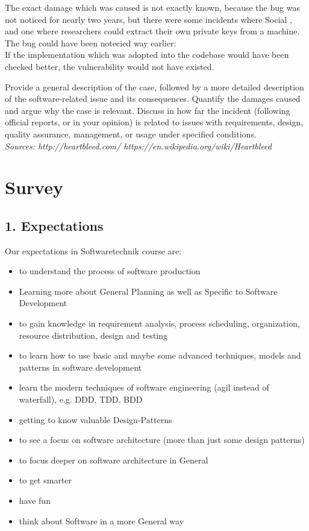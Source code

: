 \documentclass{scrartcl}
\begin{document}
The exact damage which was caused is not exactly known, because the bug was not noticed for nearly two years, but there were some incidents where
Social , and one where researchers could extract their own private keys from a machine.\\
The bug could have been notecied way earlier:\\
If the implementation which was adopted into the codebase would have been checked better, the vulnerability would not have existed.


Provide a general description of the case, followed by a more detailed description of the software-related issue and its consequences.
 Quantify the damages caused and argue why the case is relevant.
Discuss in how far the incident (following official reports, or in your opinion) is related to issues with
requirements, design, quality assurance, management, or usage under specified conditions.\\
\em Sources: http://heartbleed.com/ \hspace{1cm} https://en.wikipedia.org/wiki/Heartbleed
\em 
\section*{Survey}

\subsection*{1. Expectations}
Our expectations in Softwaretechnik course are:
\begin{itemize}
\item to understand the process of software production
\item Learning more about General Planning as well as
Specific to Software Development
\item to gain knowledge in requirement analysis, process scheduling,
organization, resource distribution, design and testing
\item to learn how to use basic and maybe some advanced techniques,
models and patterns in software development
\item learn the modern techniques of software engineering (agil instead of waterfall), e.g. DDD, TDD, BDD
\item getting to know valuable Design-Patterns
\item to see a focus on software architecture (more than just some design patterns)
\item to focus deeper on software architecture in General
\item to get smarter
\item have fun
\item think about Software in a more General way
\end{itemize}
\end{document}
